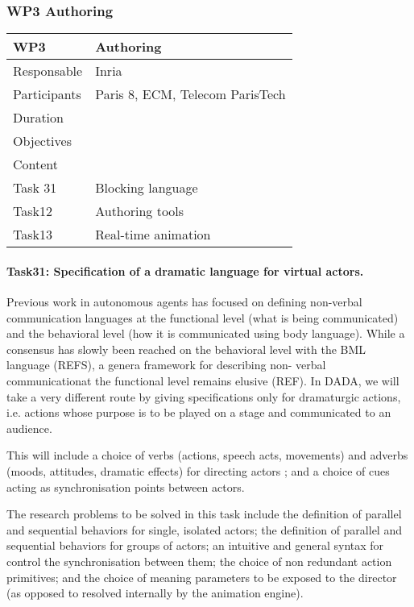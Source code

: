 \subsubsection{WP3 Authoring}


\begin{center}
\begin{tabular}{|l|l|}\hline
WP3 &  Authoring \\\hline
Responsable &  Inria  \\\hline
Participants &  Paris 8, ECM, Telecom ParisTech\\\hline
Duration  &   \\\hline
Objectives &   \\\hline
Content &  \\\hline
Task 31 & Blocking language  \\\hline
Task12 &  Authoring tools \\\hline
Task13 &  Real-time animation  \\\hline
\end{tabular}
\end{center}


\paragraph{Task31: Specification of a dramatic language for virtual actors.}

Previous work in autonomous agents has focused on defining non-verbal communication languages at the functional level (what is being communicated) and the behavioral level (how it is communicated using body language). While a consensus has slowly been reached on the behavioral level with the BML language (REFS), a genera framework for describing non- verbal communicationat the functional level remains elusive (REF). In DADA, we will take a very different route by giving specifications only for dramaturgic actions,
i.e. actions whose purpose is to be played on a stage and communicated to an audience.

This will include a choice of verbs (actions, speech acts, movements) and adverbs (moods, attitudes, dramatic effects) 
for directing actors ; and a choice of cues acting as synchronisation points between actors.

The research problems to be solved in this task include the definition of parallel and sequential behaviors
for single, isolated actors; the definition of parallel and sequential behaviors for groups of actors; an intuitive and general 
syntax for control the synchronisation between them; the choice of non redundant action primitives; and the choice of meaning parameters to be exposed to the director (as opposed to resolved internally by the animation engine).

